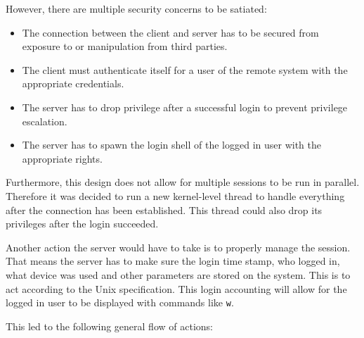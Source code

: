 \documentclass[10pt,a4paper,titlepage,twoside,english,final]{zhawreprt}
\begin{document}
However, there are multiple security concerns to be satiated:

\begin{itemize}
\item The connection between the client and server has to be secured from exposure to or manipulation from third parties.
\item The client must authenticate itself for a user of the remote system with the appropriate credentials.
\item The server has to drop privilege after a successful \gls{login} to prevent privilege escalation.
\item The server has to spawn the \gls{login} \gls{shell} of the logged in user with the appropriate rights.
\end{itemize}

Furthermore, this design does not allow for multiple sessions to be run in parallel.
Therefore it was decided to run a new kernel-level thread to handle everything after the connection has been established.
This thread could also drop its privileges after the \gls{login} succeeded.

Another action the server would have to take is to properly manage the session.
That means the server has to make sure the \gls{login} time stamp, who logged in, what device was used and other parameters are stored on the system.
This is to act according to the \gls{Unix} specification.
This \gls{login} accounting will allow for the logged in user to be displayed with commands like \texttt{w}.

This led to  the following general flow of actions:
\end{document}
